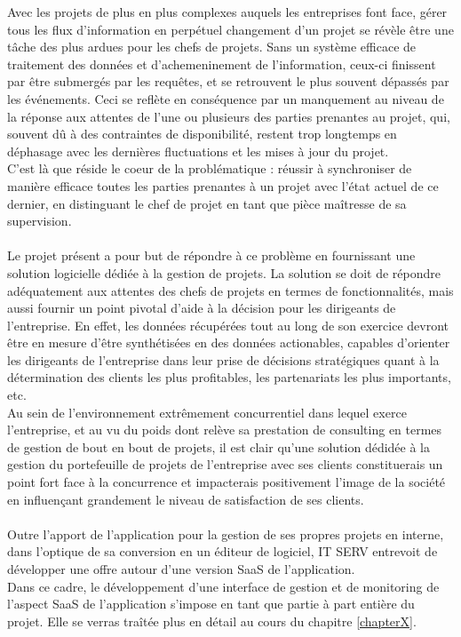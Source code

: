\begin{spacing}{1.5}
Avec les projets de plus en plus complexes auquels les entreprises font face, gérer tous les flux d'information en perpétuel changement d'un projet se révèle être une tâche des plus ardues pour les chefs de projets. Sans un système efficace de traitement des données et d'achemeninement de l'information, ceux-ci finissent par être submergés par les requêtes, et se retrouvent le plus souvent dépassés par les événements. Ceci se reflète en conséquence par un manquement au niveau de la réponse aux attentes de l'une ou plusieurs des parties prenantes au projet, qui, souvent dû à des contraintes de disponibilité, restent trop longtemps en déphasage avec les dernières fluctuations et les mises à jour du projet.\\
C'est là que réside le coeur de la problématique : réussir à synchroniser de manière efficace toutes les parties prenantes à un projet avec l'état actuel de ce dernier, en distinguant le chef de projet en tant que pièce maîtresse de sa supervision.\\
\\
Le projet présent a pour but de répondre à ce problème en fournissant une solution logicielle dédiée à la gestion de projets. La solution se doit de répondre adéquatement aux attentes des chefs de projets en termes de fonctionnalités, mais aussi fournir un point pivotal d'aide à la décision pour les dirigeants de l'entreprise. En effet, les données récupérées tout au long de son exercice devront être en mesure d'être synthétisées en des données actionables, capables d'orienter les dirigeants de l'entreprise dans leur prise de décisions stratégiques quant à la détermination des clients les plus profitables, les partenariats les plus importants, etc.\\
Au sein de l'environnement extrêmement concurrentiel dans lequel exerce l'entreprise, et au vu du poids dont relève sa prestation de consulting en termes de gestion de bout en bout de projets, il est clair qu'une solution dédidée à la gestion du portefeuille de projets de l'entreprise avec ses clients constituerais un point fort face à la concurrence et impacterais positivement l'image de la société en influençant grandement le niveau de satisfaction de ses clients.\\
\\
Outre l'apport de l'application pour la gestion de ses propres projets en interne, dans l'optique de sa conversion en un éditeur de logiciel, IT SERV entrevoit de développer une offre autour d'une version SaaS de l'application.\\
 Dans ce cadre, le développement d'une interface de gestion et de monitoring de l'aspect SaaS de l'application s'impose en tant que partie à part entière du projet. Elle se verras traîtée plus en détail au cours du chapitre \ref{chapterX}.



\end{spacing}
